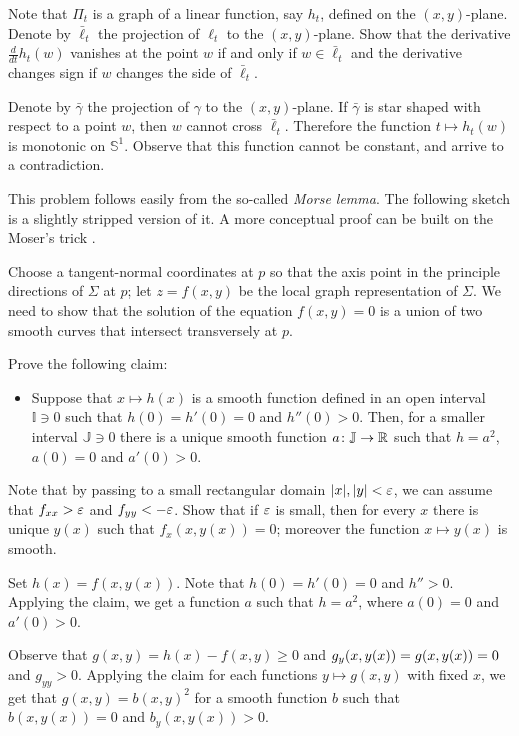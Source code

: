 Note that $\Pi_t$ is a graph of a linear function, say $h_t$, defined on the $(x, y)$-plane.
Denote by $\bar\ell_t$ the projection of $\ell_t$ to the $(x, y)$-plane.
Show that the derivative $\tfrac{d}{dt}h_t(w)$ vanishes at the point $w$ if and only if $w\in \bar\ell_t$ 
and the derivative changes sign if $w$ changes the side of $\bar\ell_t$.

Denote by $\bar\gamma$ the projection of $\gamma$ to the $(x, y)$-plane.
If $\bar\gamma$ is star shaped with respect to a point $w$, then $w$ cannot cross $\bar\ell_t$.
Therefore the function $t\mapsto h_t(w)$ is monotonic on $\mathbb{S}^1$.
Observe that this function cannot be constant, and arrive to a contradiction.

This problem follows easily from the so-called \emph{Morse lemma}.
The following sketch is a slightly stripped version of it.
A more conceptual proof can be built on the Moser's trick \cite{palais}.

\medskip

Choose a tangent-normal coordinates at $p$ so that the axis point in the principle directions of $\Sigma$ at $p$;
let $z=f(x,y)$ be the local graph representation of $\Sigma$.
We need to show that the solution of the equation $f(x,y)=0$ is a union of two smooth curves that intersect transversely at $p$.

Prove the following claim:
\begin{itemize}
 \item Suppose that  $x\mapsto h(x)$ is a smooth function defined in an open interval $\mathbb{I}\ni0$ such that $h(0)=h'(0)=0$ and $h''(0)>0$.
 Then, for a smaller interval $\mathbb{J}\ni0$ there is a unique smooth function $a\colon\mathbb{J}\to\mathbb{R}$ such that $h=a^2$, $a(0)=0$ and $a'(0)> 0$.
\end{itemize}
Note that by passing to a small rectangular domain $|x|,|y|<\varepsilon$, we can assume that $f_{xx}>\varepsilon$ and $f_{yy}<-\varepsilon$. 
Show that if $\varepsilon$ is small, then for every $x$ there is unique $y(x)$ such that $f_x(x,y(x))=0$; 
moreover the function $x\mapsto y(x)$ is smooth.

Set $h(x)=f(x,y(x))$.
Note that $h(0)=h'(0)=0$ and $h''>0$.
Applying the claim, we get a function $a$ such that $h=a^2$, where $a(0)=0$ and $a'(0)>0$.

Observe that $g(x,y)=h(x)-f(x,y)\ge 0$ and $g_y(x,y(x))\z=g(x,y(x))\z=0$ and $g_{yy}>0$.
Applying the claim for each functions $y\mapsto g(x,y)$ with fixed $x$, we get that $g(x,y)=b(x,y)^2$ for a smooth function $b$ such that 
$b(x,y(x))=0$ and $b_y(x,y(x))>0$.

